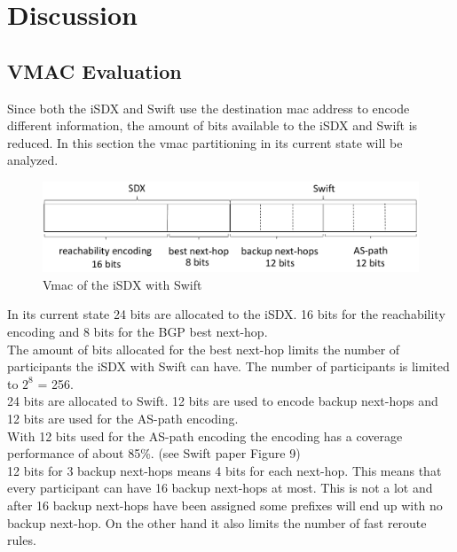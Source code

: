 \chapter{\label{chapter 4}Discussion}


\section{\label{chapter4:vmac evaluation}VMAC Evaluation}

Since both the iSDX and Swift use the destination mac address to encode different information, the amount of bits available to  the iSDX and Swift is reduced. In this section the vmac partitioning in its current state will be analyzed.

\begin{figure}[h]
\center
\includegraphics[scale = 0.65]{Figures/eval_vmac_cropped2.pdf}
\caption{Vmac of the iSDX with Swift}
\end{figure}

In its current state 24 bits are allocated to the iSDX. 16 bits for the reachability encoding and 8 bits for the BGP best next-hop. \\
The amount of bits allocated for the best next-hop limits the number of participants the iSDX with Swift can have. The number of participants is limited to $2^8$ = 256. \\
24 bits are allocated to Swift. 12 bits are used to encode backup next-hops and 12 bits are used for the AS-path encoding. \\
With 12 bits used for the AS-path encoding the encoding has a coverage performance of about 85\%. (see Swift paper Figure 9)\\
12 bits for 3 backup next-hops means 4 bits for each next-hop. This means that every participant can have 16 backup next-hops at most. This is not a lot and after 16 backup next-hops have been assigned some prefixes will end up with no backup next-hop. On the other hand it also limits the number of fast reroute rules. 


